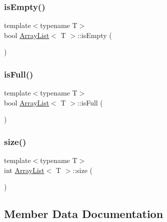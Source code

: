 \mbox{\label{classArrayList_afd03a1f3e7d06aeef6f49b65406464b8}} 
\subsubsection{\texorpdfstring{is\+Empty()}{isEmpty()}}
{\footnotesize\ttfamily template$<$typename T$>$ \\
bool \hyperlink{classArrayList}{Array\+List}$<$ T $>$\+::is\+Empty (\begin{DoxyParamCaption}{ }\end{DoxyParamCaption})\hspace{0.3cm}{\ttfamily [inline]}}

\mbox{\label{classArrayList_abca4b69f0844b065f47c15843578d3b7}} 
\subsubsection{\texorpdfstring{is\+Full()}{isFull()}}
{\footnotesize\ttfamily template$<$typename T$>$ \\
bool \hyperlink{classArrayList}{Array\+List}$<$ T $>$\+::is\+Full (\begin{DoxyParamCaption}{ }\end{DoxyParamCaption})\hspace{0.3cm}{\ttfamily [inline]}}

\mbox{\label{classArrayList_ae5c94c16a0186b9955ff584cf445dee8}} 
\subsubsection{\texorpdfstring{size()}{size()}}
{\footnotesize\ttfamily template$<$typename T$>$ \\
int \hyperlink{classArrayList}{Array\+List}$<$ T $>$\+::size (\begin{DoxyParamCaption}{ }\end{DoxyParamCaption})\hspace{0.3cm}{\ttfamily [inline]}}



\subsection{Member Data Documentation}
\mbox{\label{classArrayList_a67885e14511b74dda49074ffa39d4761}} 
